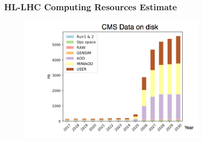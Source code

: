 \begin{frame}
\frametitle{HL-LHC Computing Resources Estimate}

\begin{figure}[htbp]
\begin{center}
\includegraphics[width=0.8\textwidth]{images/hllhc-compute-challenges-brief-1.png}
\end{center}
\end{figure}


\end{frame}



